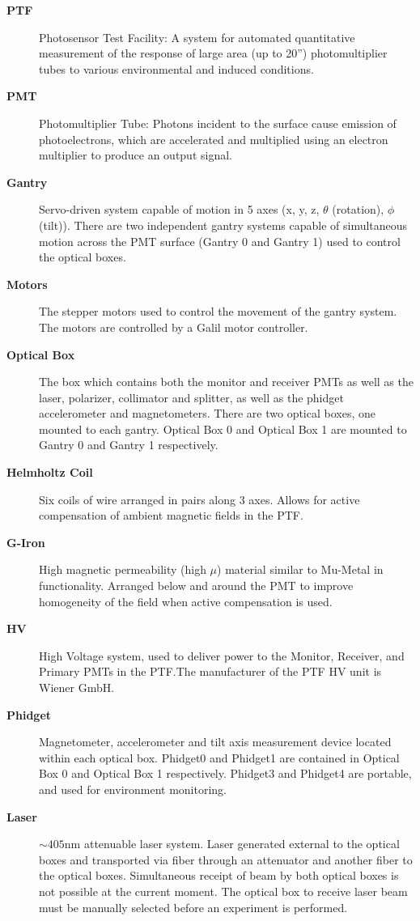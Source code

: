 \documentclass[twoside,letterpaper]{refart}
\begin{document}
\begin{description}
	\item[\textbf{PTF}] Photosensor Test Facility: A system for automated quantitative measurement of the response of large area (up to 20'') photomultiplier tubes to various environmental and induced conditions.
	\item[\textbf{PMT}] Photomultiplier Tube: Photons incident to the surface cause emission of photoelectrons, which are accelerated and multiplied using an electron multiplier to produce an output signal.
	\item[\textbf{Gantry}] Servo-driven system capable of motion in 5 axes (x, y, z, $\theta$ (rotation), $\phi$ (tilt)). There are two independent gantry systems capable of simultaneous motion across the PMT surface (Gantry 0 and Gantry 1) used to control the optical boxes.
	\item[\textbf{Motors}] The stepper motors used to control the movement of the gantry system. The motors are controlled by a Galil motor controller.
	\item[\textbf{Optical Box}] The box which contains both the monitor and receiver PMTs as well as the laser, polarizer, collimator and splitter, as well as the phidget accelerometer and magnetometers. There are two optical boxes, one mounted to each gantry. Optical Box 0 and Optical Box 1 are mounted to Gantry 0 and Gantry 1 respectively.
	\item[\textbf{Helmholtz Coil}] Six coils of wire arranged in pairs along 3 axes. Allows for active compensation of ambient magnetic fields in the PTF.
	\item[\textbf{G-Iron}] High magnetic permeability (high $\mu$) material similar to Mu-Metal in functionality. Arranged below and around the PMT to improve homogeneity of the field when active compensation is used.
	\item[\textbf{HV}] High Voltage system, used to deliver power to the Monitor, Receiver, and Primary PMTs in the PTF.\@ The manufacturer of the PTF HV unit is Wiener GmbH.
	\item[\textbf{Phidget}] Magnetometer, accelerometer and tilt axis measurement device located within each optical box. Phidget0 and Phidget1 are contained in Optical Box 0 and Optical Box 1 respectively. Phidget3 and Phidget4 are portable, and used for environment monitoring.
	\item[\textbf{Laser}] $\sim\!405\text{nm}$ attenuable laser system. Laser generated external to the optical boxes and transported via fiber through an attenuator and another fiber to the optical boxes. Simultaneous receipt of beam by both optical boxes is not possible at the current moment. The optical box to receive laser beam must be manually selected before an experiment is performed.

\end{description}
\end{document}
